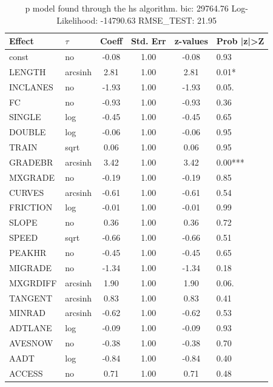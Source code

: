 \begin{table}
	\caption{p model found through the hs algorithm. bic: 29764.76 Log-Likelihood: -14790.63 RMSE_TEST: 21.95}
	\begin{center}
		\begin{tabular}{|l|l|c|c|c|l|}
			\hline
			Effect & $\tau$ & Coeff & Std. Err & z-values & Prob |z|>Z \\
			\hline
			const & no & -0.08 & 1.00 & -0.08 & 0.93 \\
			\hline
			LENGTH & arcsinh & 2.81 & 1.00 & 2.81 & 0.01* \\
			\hline
			INCLANES & no & -1.93 & 1.00 & -1.93 & 0.05. \\
			\hline
			FC & no & -0.93 & 1.00 & -0.93 & 0.36 \\
			\hline
			SINGLE & log & -0.45 & 1.00 & -0.45 & 0.65 \\
			\hline
			DOUBLE & log & -0.06 & 1.00 & -0.06 & 0.95 \\
			\hline
			TRAIN & sqrt & 0.06 & 1.00 & 0.06 & 0.95 \\
			\hline
			GRADEBR & arcsinh & 3.42 & 1.00 & 3.42 & 0.00*** \\
			\hline
			MXGRADE & no & -0.19 & 1.00 & -0.19 & 0.85 \\
			\hline
			CURVES & arcsinh & -0.61 & 1.00 & -0.61 & 0.54 \\
			\hline
			FRICTION & log & -0.01 & 1.00 & -0.01 & 0.99 \\
			\hline
			SLOPE & no & 0.36 & 1.00 & 0.36 & 0.72 \\
			\hline
			SPEED & sqrt & -0.66 & 1.00 & -0.66 & 0.51 \\
			\hline
			PEAKHR & no & -0.45 & 1.00 & -0.45 & 0.65 \\
			\hline
			MIGRADE & no & -1.34 & 1.00 & -1.34 & 0.18 \\
			\hline
			MXGRDIFF & arcsinh & 1.90 & 1.00 & 1.90 & 0.06. \\
			\hline
			TANGENT & arcsinh & 0.83 & 1.00 & 0.83 & 0.41 \\
			\hline
			MINRAD & arcsinh & -0.62 & 1.00 & -0.62 & 0.53 \\
			\hline
			ADTLANE & log & -0.09 & 1.00 & -0.09 & 0.93 \\
			\hline
			AVESNOW & no & -0.38 & 1.00 & -0.38 & 0.70 \\
			\hline
			AADT & log & -0.84 & 1.00 & -0.84 & 0.40 \\
			\hline
			ACCESS & no & 0.71 & 1.00 & 0.71 & 0.48 \\
			\hline

\end{tabular}
\end{center}
\end{table}
